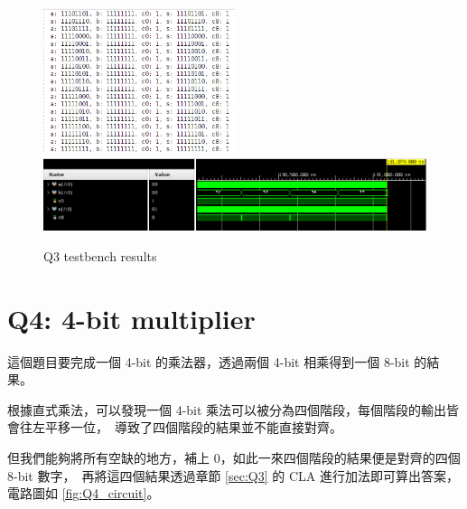 \documentclass[10.5pt,compsoc,UTF8]{CjC}
\theoremstyle{mystyle}
\begin{document}
\begin{figure}[htp]
  \centering
  \includegraphics[width=0.5\textwidth]{Q3-display.png}
  \includegraphics[width=\textwidth]{Q3-wave.png}
  \caption{Q3 testbench results}
  \label{fig:Q3_wave}
\end{figure}

\newpage

\section{Q4: 4-bit multiplier}

這個題目要完成一個 4-bit 的乘法器，透過兩個 4-bit 相乘得到一個 8-bit 的結果。
\par
根據直式乘法，可以發現一個 4-bit 乘法可以被分為四個階段，每個階段的輸出皆會往左平移一位，\
導致了四個階段的結果並不能直接對齊。
\par
但我們能夠將所有空缺的地方，補上 $0$，如此一來四個階段的結果便是對齊的四個 8-bit 數字，\ 
再將這四個結果透過章節 \ref{sec:Q3} 的 CLA 進行加法即可算出答案，電路圖如 \ref{fig:Q4_circuit}。
\end{document}
